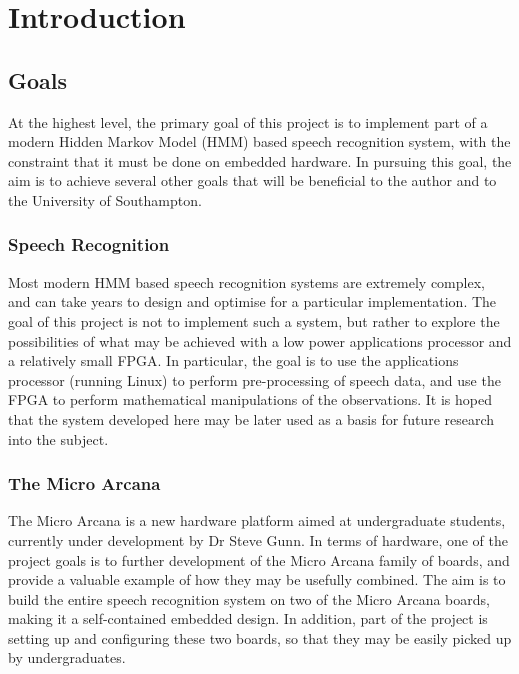 \chapter{Introduction} %
\label{cha:introduction}


\section{Goals} %
\label{sec:goals}
	At the highest level, the primary goal of this project is to implement part of a modern Hidden Markov Model (HMM)  based speech recognition system, with the constraint that it must be done on embedded hardware.  In pursuing this goal, the aim is to achieve several other goals that will be beneficial to the author and to the University of Southampton.

	\subsection{Speech Recognition} %
	\label{sec:speech_recognition}
		Most modern HMM based speech recognition systems are extremely complex, and can take years to design and optimise for a particular implementation.  The goal of this project is not to implement such a system, but rather to explore the possibilities of what may be achieved with a low power applications processor and a relatively small FPGA.  In particular, the goal is to use the applications processor (running Linux) to perform pre-processing of speech data, and use the FPGA to perform mathematical manipulations of the observations.  It is hoped that the system developed here may be later used as a basis for future research into the subject.

	\subsection{The Micro Arcana} %
	\label{sec:the_micro_arcana}
		The Micro Arcana is a new hardware platform aimed at undergraduate students, currently under development by Dr Steve Gunn.  
		In terms of hardware, one of the project goals is to further development of the Micro Arcana family of boards, and provide a valuable example of how they may be usefully combined.  The aim is to build the entire speech recognition system on two of the Micro Arcana boards, making it a self-contained embedded design.  In addition, part of the project is setting up and configuring these two boards, so that they may be easily picked up by undergraduates.

